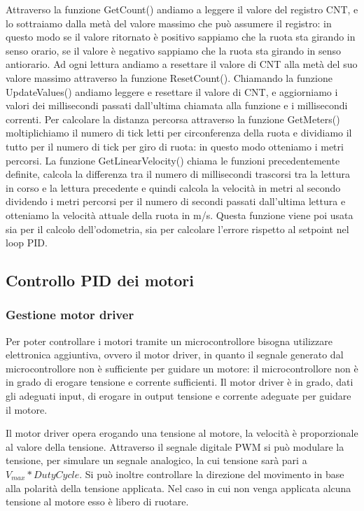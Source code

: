 Attraverso la funzione GetCount() andiamo a leggere il valore del registro CNT, e lo sottraiamo dalla metà del valore massimo che può assumere il registro: in questo modo se il valore ritornato è positivo sappiamo che la ruota sta girando in senso orario, se il valore è negativo sappiamo che la ruota sta girando in senso antiorario. Ad ogni lettura andiamo a resettare il valore di CNT alla metà del suo valore massimo attraverso la funzione ResetCount().
Chiamando la funzione UpdateValues() andiamo leggere e resettare il valore di CNT, e aggiorniamo i valori dei millisecondi passati dall'ultima chiamata alla funzione e i millisecondi correnti.
Per calcolare la distanza percorsa attraverso la funzione GetMeters() moltiplichiamo il numero di tick letti per circonferenza della ruota e dividiamo il tutto per il numero di tick per giro di ruota: in questo modo otteniamo i metri percorsi.
La funzione GetLinearVelocity() chiama le funzioni precedentemente definite, calcola la differenza tra il numero di millisecondi trascorsi tra la lettura in corso e la lettura precedente e quindi calcola la velocità in metri al secondo dividendo i metri percorsi per il numero di secondi passati dall'ultima lettura e otteniamo la velocità attuale della ruota in m/s. Questa funzione viene poi usata sia per il calcolo dell'odometria, sia per calcolare l'errore rispetto al setpoint nel loop PID.

\subsection{Controllo PID dei motori}

\subsubsection{Gestione motor driver}

Per poter controllare i motori tramite un microcontrollore bisogna utilizzare elettronica aggiuntiva, ovvero il motor driver, in quanto il segnale generato dal microcontrollore non è sufficiente per guidare un motore: il microcontrollore non è in grado di erogare tensione e corrente sufficienti.
Il motor driver è in grado, dati gli adeguati input, di erogare in output tensione e corrente adeguate per guidare il motore.

Il motor driver opera erogando una tensione al motore, la velocità è proporzionale al valore della tensione. Attraverso il segnale digitale PWM si può modulare la tensione, per simulare un segnale analogico, la cui tensione sarà pari a $V_{max}*Duty Cycle$. 
Si può inoltre controllare la direzione del movimento in base alla polarità della tensione applicata. Nel caso in cui non venga applicata alcuna tensione al motore esso è libero di ruotare.

